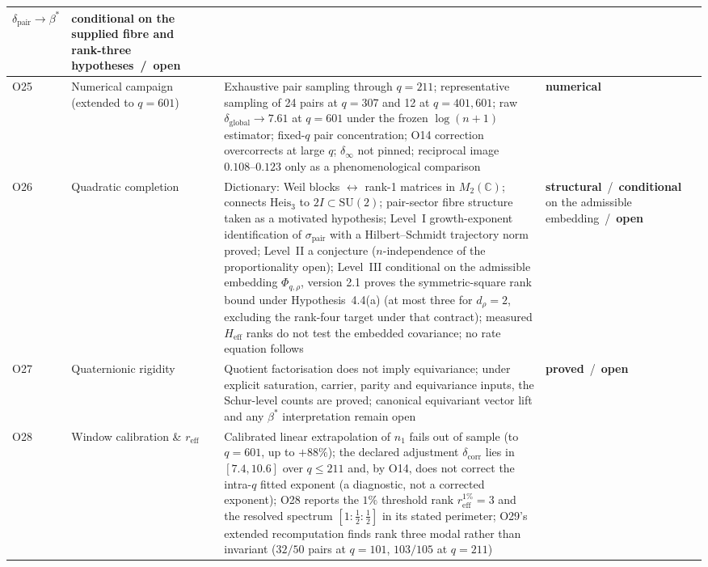 \documentclass[11pt,a4paper]{article}
\newcommand{\Heis}{\mathrm{Heis}}
\newcommand{\SU}{\mathrm{SU}}
\newcommand{\sproved}{\textcolor{cproved}{\textbf{proved}}}
\newcommand{\sstruct}{\textcolor{cstruct}{\textbf{structural}}}
\newcommand{\sopen}{\textcolor{copen}{\textbf{open}}}
\newcommand{\snum}{\textcolor{cnum}{\textbf{numerical}}}
\newcommand{\scond}{\textcolor{ccond}{\textbf{conditional}}}
\begin{document}
\begin{longtable}{@{}p{1.70cm}p{2.9cm}p{1.3cm}p{6.25cm}>{\raggedright\arraybackslash}p{2.0cm}@{}}
      $\delta_{\mathrm{pair}} \to \beta^*$ &
      \scond{} on the supplied fibre and rank-three hypotheses\ /\ \sopen \\[3pt]
      \midrule
      O25 & Numerical campaign (extended to $q=601$) & \cite{Beau2026a29} &
      Exhaustive pair sampling through $q=211$; representative sampling of 24 pairs at $q=307$
      and 12 at $q=401,601$; raw $\delta_{\mathrm{global}} \to 7.61$ at $q=601$ under the frozen
      $\log(n+1)$ estimator; fixed-$q$ pair concentration; O14 correction overcorrects at large $q$;
      $\delta_\infty$ not pinned; reciprocal image $0.108\text{--}0.123$ only as a
      phenomenological comparison &
      \snum \\[3pt]
      O26 & Quadratic completion & \cite{Beau2026a30} &
      Dictionary: Weil blocks $\leftrightarrow$ rank-1 matrices in $M_2(\mathbb{C})$;
      connects $\Heis_3$ to $2I \subset \SU(2)$; pair-sector fibre structure taken as a motivated
      hypothesis; Level~I growth-exponent identification of $\sigma_{\mathrm{pair}}$ with a
      Hilbert--Schmidt trajectory norm proved; Level~II a conjecture ($n$-independence of the
      proportionality open); Level~III conditional on the admissible embedding $\Phi_{q,\rho}$,
      version 2.1 proves the symmetric-square rank bound under Hypothesis~4.4(a)
      (at most three for $d_\rho=2$, excluding the rank-four target under that contract);
      measured $H_{\mathrm{eff}}$ ranks do not test the embedded covariance; no rate equation follows &
      \sstruct\ /\ \scond{} on the admissible embedding\ /\ \sopen \\[3pt]
      O27 & Quaternionic rigidity & \cite{Beau2026a31} &
      Quotient factorisation does not imply equivariance; under explicit saturation,
      carrier, parity and equivariance inputs, the Schur-level counts are proved; canonical
      equivariant vector lift and any $\beta^*$ interpretation remain open &
      \sproved\ /\ \sopen \\[3pt]
      O28 & Window calibration \& $r_{\mathrm{eff}}$ & \cite{Beau2026a32} &
      Calibrated linear extrapolation of $n_1$ fails out of sample (to $q=601$, up to $+88\%$);
      the declared adjustment $\delta_{\mathrm{corr}}$ lies in $[7.4, 10.6]$ over $q \le 211$ and, by O14,
      does not correct the intra-$q$ fitted exponent (a diagnostic, not a corrected exponent); O28 reports the
      $1\%$ threshold rank $r_{\mathrm{eff}}^{1\%}=3$ and the resolved spectrum
      $[1:\tfrac{1}{2}:\tfrac{1}{2}]$ in its stated perimeter; O29's extended recomputation finds
      rank three modal rather than invariant ($32/50$ pairs at $q=101$, $103/105$ at $q=211$) &

\end{longtable}
\end{document}

